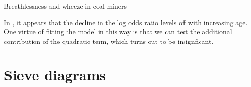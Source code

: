 \documentclass[11pt]{book}
\renewenvironment{knitrout}{\small\renewcommand{\baselinestretch}{.85}}{} %
\begin{document}
\begin{Example}[wheeze1]{Breathlessness and wheeze in coal miners}
\begin{knitrout}
\begin{kframe}
{\ttfamily\noindent\bfseries\color{errorcolor}{\#\# Error: object 'CM' not found}}\begin{alltt}
 \hlstd{=}\hlstd{,} \hlstd{=}\hlstd{,} \hlstd{=}\hlstd{,}
      \hlstd{=} \hlstd{,}
      \hlstd{=} \hlstd{)}
\end{alltt}


{\ttfamily\noindent\bfseries\color{errorcolor}{\#\# Error: object 'lodds' not found}}\begin{alltt}
 \hlkwb{<-} \hlstd{(}\hlstd{,} \hlstd{,}  \hlstd{=} \hlstd{)}
 \hlkwb{<-}  \hlopt{~}  \hlstd{))}
\end{alltt}


{\ttfamily\noindent\bfseries\color{errorcolor}{\#\# Error: object 'lodds' not found}}\begin{alltt}
\hlstd{(}  \hlstd{=} \hlstd{,} \hlstd{=}\hlstd{)}
\end{alltt}


{\ttfamily\noindent\bfseries\color{errorcolor}{\#\# Error: object 'mod' not found}}\end{kframe}
\end{knitrout}
In , it appears that the decline in the
log odds ratio levels off with increasing age.  One virtue of
fitting the model in this way is that we can test the additional contribution
of the quadratic term, which turns out to be insignficant.
\begin{knitrout}
\color{fgcolor}\begin{kframe}
\begin{alltt}
\end{alltt}


{\ttfamily\noindent\bfseries\color{errorcolor}{\#\# Error: object 'mod' not found}}\end{kframe}
\end{knitrout}

\end{Example}

\section{Sieve diagrams}\label{sec:twoway-sieve}
\end{document}
